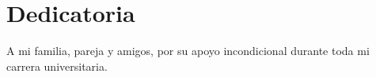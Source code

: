 \chapter*{Dedicatoria}
{}

A mi familia, pareja y amigos, por su apoyo incondicional durante toda mi carrera universitaria.

\cleardoublepage
